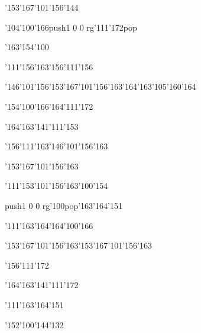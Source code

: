 \null\vfill\ipa\centerline{\enskip\enskip\enskip\enskip\enskip\enskip\enskip\enskip\char'153\char'167\char'101\char'156\char'144}\medskip\centerline{\enskip\enskip\enskip\char'104\char'100\char'166\enskip\enskip\enskip\enskip\enskip\enskip\pdfcolorstack\match push{1 0 0 rg}\char'111\char'172\pdfcolorstack\match pop{}}\medskip\centerline{\enskip\enskip\enskip\char'163\char'154\char'100\enskip\enskip\enskip\enskip\enskip\enskip}\medskip\centerline{\enskip\enskip\enskip\enskip\char'111\char'156\char'163\enskip\enskip\enskip\enskip\char'156\char'111\char'156}\medskip\centerline{\enskip\char'146\char'101\char'156\enskip\char'153\char'167\char'101\char'156\char'163\enskip\char'164\char'163\char'105\char'160\char'164\enskip\enskip\enskip}\medskip\centerline{\enskip\enskip\enskip\enskip\enskip\enskip\enskip\char'154\char'100\char'166\enskip\char'164\char'111\char'172\enskip\enskip\enskip}\medskip\centerline{\enskip\char'164\char'163\char'141\char'111\char'153\enskip\enskip\enskip\enskip\enskip\enskip\enskip\enskip\enskip\enskip\enskip\enskip}\medskip\centerline{\enskip\enskip\enskip\enskip\enskip\enskip\enskip\enskip\enskip\enskip\enskip\enskip}\medskip\centerline{\enskip\enskip\enskip\enskip\enskip\enskip\enskip\char'156\char'111\char'163\enskip\char'146\char'101\char'156\char'163}\medskip\vfill\footline{\hfil\tt\folio\hfil}\eject
\null\vfill\ipa\centerline{\enskip\enskip\enskip\enskip\enskip\enskip\enskip\enskip\char'153\char'167\char'101\char'156\char'163}\medskip\centerline{\enskip\char'111\enskip\enskip\enskip\enskip\enskip\char'153\char'101\char'156\char'163\enskip\char'100\char'154}\medskip\centerline{\enskip\pdfcolorstack\match push{1 0 0 rg}\char'100\pdfcolorstack\match pop{}\enskip\char'163\char'164\char'151\enskip\enskip\enskip\enskip\enskip\enskip}\medskip\centerline{\enskip\enskip\enskip\enskip\char'111\char'163\char'164\enskip\enskip\enskip\enskip\char'164\char'100\char'166}\medskip\centerline{\enskip\enskip\enskip\enskip\enskip\char'153\char'167\char'101\char'156\char'163\enskip\char'153\char'167\char'101\char'156\char'163\enskip\enskip\enskip}\medskip\centerline{\enskip\enskip\enskip\enskip\enskip\enskip\enskip\char'156\char'111\char'172\enskip\enskip\enskip\enskip\enskip\enskip\enskip}\medskip\centerline{\enskip\char'164\char'163\char'141\char'111\char'172\enskip\enskip\enskip\enskip\enskip\enskip\enskip\enskip\enskip\enskip\enskip\enskip}\medskip\centerline{\enskip\char'111\enskip\char'163\char'164\char'151\enskip\enskip\enskip\enskip\enskip\enskip}\medskip\centerline{\enskip\enskip\enskip\enskip\enskip\enskip\enskip\enskip\enskip\enskip\enskip\char'152\char'100\char'144\char'132}\medskip\vfill\footline{\hfil\tt\folio\hfil}\eject
